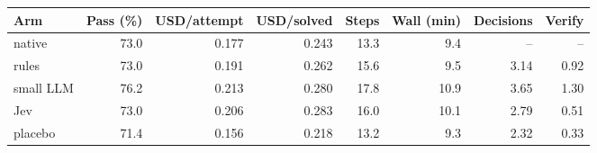 \begin{tabular}{lrrrrrrr}
\toprule
Arm & Pass (\%) & USD/attempt & USD/solved & Steps & Wall (min) & Decisions & Verify \\
\midrule
native & 73.0 & 0.177 & 0.243 & 13.3 & 9.4 & -- & -- \\
rules & 73.0 & 0.191 & 0.262 & 15.6 & 9.5 & 3.14 & 0.92 \\
small LLM & 76.2 & 0.213 & 0.280 & 17.8 & 10.9 & 3.65 & 1.30 \\
Jev & 73.0 & 0.206 & 0.283 & 16.0 & 10.1 & 2.79 & 0.51 \\
placebo & 71.4 & 0.156 & 0.218 & 13.2 & 9.3 & 2.32 & 0.33 \\
\bottomrule
\end{tabular}
